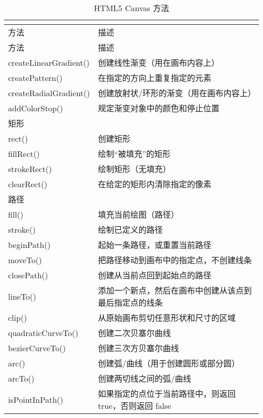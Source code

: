 \begin{longtable}{|p{120pt}|p{270pt}|}
\multicolumn{2}{r}{}
\tabularnewline\hline
方法		&描述
\endhead

\caption{HTML5 Canvas 方法}\\
\hline
方法		&描述
\endfirsthead

\multicolumn{2}{r}{}
\endfoot

\endlastfoot

\hline
\multicolumn{2}{|l|}{颜色、样式和阴影}\\
\hline
createLinearGradient()	&创建线性渐变（用在画布内容上）\\
\hline
createPattern()		&在指定的方向上重复指定的元素\\
\hline
createRadialGradient()	&创建放射状/环形的渐变（用在画布内容上）\\
\hline
addColorStop()		&规定渐变对象中的颜色和停止位置\\
\hline
\multicolumn{2}{|l|}{矩形}	\\
\hline
rect()				&创建矩形\\
\hline
fillRect()				&绘制“被填充”的矩形\\
\hline
strokeRect()			&绘制矩形（无填充）\\
\hline
clearRect()			&在给定的矩形内清除指定的像素\\
\hline
\multicolumn{2}{|l|}{路径}\\
\hline
fill()					&填充当前绘图（路径）\\
\hline
stroke()				&绘制已定义的路径\\
\hline
beginPath()			&起始一条路径，或重置当前路径\\
\hline
moveTo()				&把路径移动到画布中的指定点，不创建线条\\
\hline
closePath()			&创建从当前点回到起始点的路径\\
\hline
lineTo()				&添加一个新点，然后在画布中创建从该点到最后指定点的线条\\
\hline
clip()				&从原始画布剪切任意形状和尺寸的区域\\
\hline
quadraticCurveTo()		&创建二次贝塞尔曲线\\
\hline
bezierCurveTo()		&创建三次方贝塞尔曲线\\
\hline
arc()					&创建弧/曲线（用于创建圆形或部分圆）\\
\hline
arcTo()				&创建两切线之间的弧/曲线\\
\hline
isPointInPath()		&如果指定的点位于当前路径中，则返回 true，否则返回 false\\

\end{longtable}
